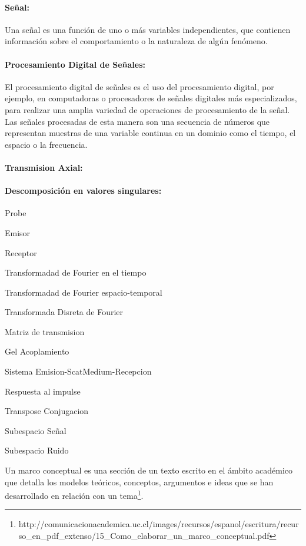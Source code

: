 \paragraph{Señal: }
Una señal es una función de uno o más variables independientes, que contienen
información sobre el comportamiento o la naturaleza de algún fenómeno.
\cite{oppenheim2016signals}

\paragraph{Procesamiento Digital de Señales:} El procesamiento digital de señales
es el uso del procesamiento digital, por ejemplo, en computadoras o procesadores
de señales digitales más especializados, para realizar una amplia variedad de
operaciones de procesamiento de la señal. Las señales procesadas de esta manera
son una secuencia de números que representan muestras de una variable continua
en un dominio como el tiempo, el espacio o la frecuencia.

\paragraph{Transmision Axial: }


\paragraph{Descomposición en valores singulares: }

Probe

Emisor

Receptor





Transformadad de Fourier en el tiempo

Transformadad de Fourier espacio-temporal

Transformada Disreta de Fourier

Matriz de transmision

Gel Acoplamiento

Sistema
Emision-ScatMedium-Recepcion

Respuesta al impulse

Transpose
Conjugacion

Subespacio Señal

Subespacio Ruido



Un marco conceptual es una sección de un texto escrito en el ámbito académico que detalla los modelos teóricos, conceptos, argumentos e ideas que se han desarrollado en relación con un tema\footnote{http://comunicacionacademica.uc.cl/images/recursos/espanol/escritura/recurso\_en\_pdf\_extenso/15\_Como\_elaborar\_un\_marco\_conceptual.pdf}.


